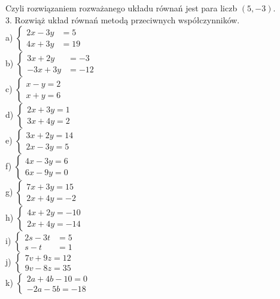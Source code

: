 \documentclass[10pt]{article}
\begin{document}
Czyli rozwiązaniem rozważanego układu równań jest para liczb \((5,-3)\).\\
3. Rozwiąż układ równań metodą przeciwnych współczynników.\\
a) \(\left\{\begin{aligned} 2 x-3 y & =5 \\ 4 x+3 y & =19\end{aligned}\right.\)\\
b) \(\left\{\begin{aligned} 3 x+2 y & =-3 \\ -3 x+3 y & =-12\end{aligned}\right.\)\\
c) \(\left\{\begin{array}{l}x-y=2 \\ x+y=6\end{array}\right.\)\\
d) \(\left\{\begin{array}{l}2 x+3 y=1 \\ 3 x+4 y=2\end{array}\right.\)\\
e) \(\left\{\begin{array}{l}3 x+2 y=14 \\ 2 x-3 y=5\end{array}\right.\)\\
f) \(\left\{\begin{array}{l}4 x-3 y=6 \\ 6 x-9 y=0\end{array}\right.\)\\
g) \(\left\{\begin{array}{l}7 x+3 y=15 \\ 2 x+4 y=-2\end{array}\right.\)\\
h) \(\left\{\begin{array}{l}4 x+2 y=-10 \\ 2 x+4 y=-14\end{array}\right.\)\\
i) \(\left\{\begin{aligned} 2 s-3 t & =5 \\ s-t & =1\end{aligned}\right.\)\\
j) \(\left\{\begin{array}{l}7 v+9 z=12 \\ 9 v-8 z=35\end{array}\right.\)\\
k) \(\left\{\begin{array}{l}2 a+4 b-10=0 \\ -2 a-5 b=-18\end{array}\right.\)\\
\end{document}
